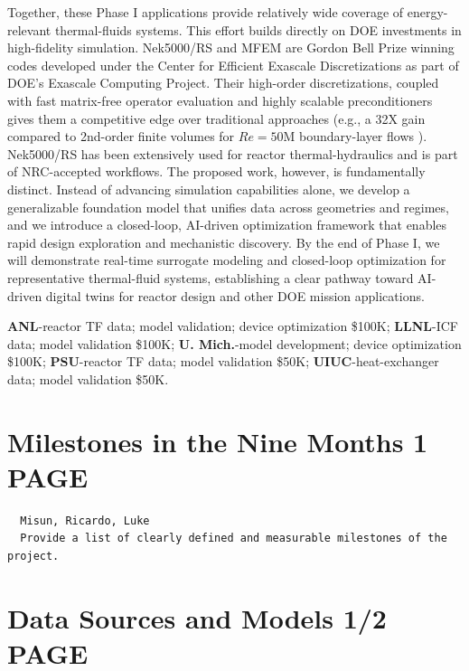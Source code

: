   Together, these Phase I applications provide relatively wide coverage of
energy-relevant thermal-fluids systems.
This effort builds directly on DOE investments in high-fidelity simulation.
Nek5000/RS and MFEM are Gordon Bell Prize winning codes
\cite{tufo99a,gb23,gb25mfem} developed under the Center for Efficient Exascale
Discretizations as part of DOE's Exascale Computing Project.  Their high-order
discretizations, coupled with fast matrix-free operator evaluation and highly
scalable preconditioners gives them a competitive edge over traditional approaches
(e.g., a 32X gain compared to 2nd-order finite volumes for $Re=50$M
boundary-layer flows \cite{Min2024Wind,Tomboulides2024ABL}).  Nek5000/RS has
been extensively used for reactor thermal-hydraulics and is part of
NRC-accepted workflows. The proposed work, however, is fundamentally distinct.
Instead of advancing simulation capabilities alone, we develop a generalizable
foundation model that unifies data across geometries and regimes, and we
introduce a closed-loop, AI-driven optimization framework that enables rapid
design exploration and mechanistic discovery. By the end of Phase I, we will
demonstrate real-time surrogate modeling and closed-loop optimization for
representative thermal-fluid systems, establishing a clear pathway toward
AI-driven digital twins for reactor design and other DOE mission applications.


\vspace*{.1in}
   {\bf ANL}-reactor TF data; model validation; device optimization \$100K;
   {\bf LLNL}-ICF data; model validation \$100K;
   {\bf U. Mich.}-model development; device optimization \$100K;
   {\bf PSU}-reactor TF data; model validation \$50K;
   {\bf UIUC}-heat-exchanger data; model validation \$50K.


\newpage
\section{  Milestones in the Nine Months \hspace{1.0in} 1 PAGE}

\tiny \small \begin{verbatim}
  Misun, Ricardo, Luke
  Provide a list of clearly defined and measurable milestones of the project.
\end{verbatim}
\normalsize

\newpage
\section{    Data Sources and Models \hspace{1.0in} 1/2 PAGE}

